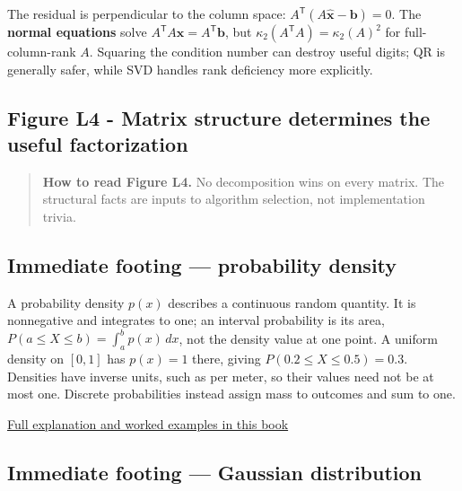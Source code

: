 The residual is perpendicular to the column space: \(A^\mathsf T(A\widehat{\mathbf x}-\mathbf b)=0\). The \textbf{normal equations} solve \(A^\mathsf T A\mathbf x=A^\mathsf T\mathbf b\), but \(\kappa_2(A^\mathsf T A)=\kappa_2(A)^2\) for full-column-rank \(A\). Squaring the condition number can destroy useful digits; QR is generally safer, while SVD handles rank deficiency more explicitly.

\subsection{Figure L4 - Matrix structure determines the useful factorization}\label{01-foundations-i-ch020-figure-l4---matrix-structure-determines-the-useful-factorization}

\hypertarget{01-foundations-i-ch020-figure-l4---matrix-structure-determines-the-useful-factorization}{}


\begin{quote}
\textbf{How to read Figure L4.} No decomposition wins on every matrix. The structural facts are inputs to algorithm selection, not implementation trivia.
\end{quote}

\subsection{Immediate footing --- probability density}\label{01-foundations-i-ch020-immediate-footing-probability-density}

\hypertarget{01-foundations-i-ch020-immediate-footing-probability-density}{}

A probability density \(p(x)\) describes a continuous random quantity. It is nonnegative and integrates to one; an interval probability is its area, \(P(a\le X\le b)=\int_a^b p(x)\,dx\), not the density value at one point. A uniform density on \([0,1]\) has \(p(x)=1\) there, giving \(P(0.2\le X\le0.5)=0.3\). Densities have inverse units, such as per meter, so their values need not be at most one. Discrete probabilities instead assign mass to outcomes and sum to one.

\hyperref[02-foundations-ii-ch023-random-quantities-and-their-probability-laws]{Full explanation and worked examples in this book}

\subsection{Immediate footing --- Gaussian distribution}\label{01-foundations-i-ch020-immediate-footing-gaussian-distribution}

